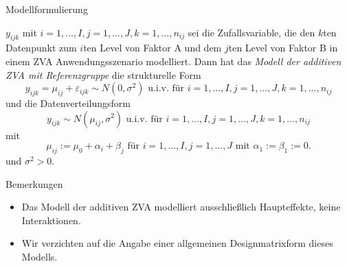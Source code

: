 \documentclass[
  8pt,
  ignorenonframetext,
]{beamer}
\providecommand{\tightlist}{%
  \setlength{\itemsep}{0pt}\setlength{\parskip}{0pt}}
\begin{document}
\begin{frame}{Modellformulierung}
\protect\hypertarget{modellformulierung-1}{}
\footnotesize
\begin{definition}
\justifying
$y_{ijk}$ mit $i = 1,...,I, j = 1,...,J, k = 1,...,n_{ij}$ sei die Zufallsvariable,
die den $k$ten Datenpunkt zum $i$ten Level von Faktor A und dem $j$ten Level von
Faktor B in einem ZVA Anwendungsszenario modelliert. Dann hat das
\textit{Modell der additiven ZVA mit Referenzgruppe} die strukturelle Form
\begin{equation}
y_{ijk} = \mu_{ij} + \varepsilon_{ijk} \sim N(0,\sigma^2)
\mbox{ u.i.v. für } i = 1,...,I, j = 1,...,J, k = 1,...,n_{ij}
\end{equation}
und die Datenverteilungsform
\begin{equation}
y_{ijk} \sim N(\mu_{ij}, \sigma^2) \mbox{ u.i.v. für } i = 1,...,I, j = 1,...,J, k = 1,...,n_{ij}
\end{equation}
mit
\begin{equation}
\mu_{ij} := \mu_0 + \alpha_i + \beta_j \mbox{ für } i = 1,...,I, j = 1,...,J \mbox{ mit } \alpha_1 := \beta_1 := 0.
\end{equation}
und $\sigma^2 > 0$.
\end{definition}

Bemerkungen

\begin{itemize}
\tightlist
\item
  Das Modell der additiven ZVA modelliert ausschließlich Haupteffekte,
  keine Interaktionen.
\item
  Wir verzichten auf die Angabe einer allgemeinen Designmatrixform
  dieses Modells.
\end{itemize}
\end{frame}
\end{document}
